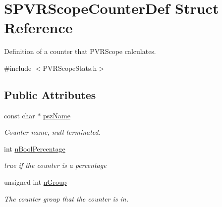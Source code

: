 \hypertarget{struct_s_p_v_r_scope_counter_def}{\section{S\+P\+V\+R\+Scope\+Counter\+Def Struct Reference}
\label{struct_s_p_v_r_scope_counter_def}
}


Definition of a counter that P\+V\+R\+Scope calculates.  




{\ttfamily \#include $<$P\+V\+R\+Scope\+Stats.\+h$>$}

\subsection*{Public Attributes}
\begin{DoxyCompactItemize}
\item 
\hypertarget{struct_s_p_v_r_scope_counter_def_a325aca5138ab949b5086ff8e71ff3394}{const char $\ast$ \hyperlink{struct_s_p_v_r_scope_counter_def_a325aca5138ab949b5086ff8e71ff3394}{psz\+Name}}\label{struct_s_p_v_r_scope_counter_def_a325aca5138ab949b5086ff8e71ff3394}

\begin{DoxyCompactList}\small\item\em Counter name, null terminated. \end{DoxyCompactList}\item 
\hypertarget{struct_s_p_v_r_scope_counter_def_afcfd63ee934612b742f9e487c017a2ac}{int \hyperlink{struct_s_p_v_r_scope_counter_def_afcfd63ee934612b742f9e487c017a2ac}{n\+Bool\+Percentage}}\label{struct_s_p_v_r_scope_counter_def_afcfd63ee934612b742f9e487c017a2ac}

\begin{DoxyCompactList}\small\item\em true if the counter is a percentage \end{DoxyCompactList}\item 
\hypertarget{struct_s_p_v_r_scope_counter_def_a972035e8b95d1fc294ca1e13be2a76a1}{unsigned int \hyperlink{struct_s_p_v_r_scope_counter_def_a972035e8b95d1fc294ca1e13be2a76a1}{n\+Group}}\label{struct_s_p_v_r_scope_counter_def_a972035e8b95d1fc294ca1e13be2a76a1}

\begin{DoxyCompactList}\small\item\em The counter group that the counter is in. \end{DoxyCompactList}\end{DoxyCompactItemize}


